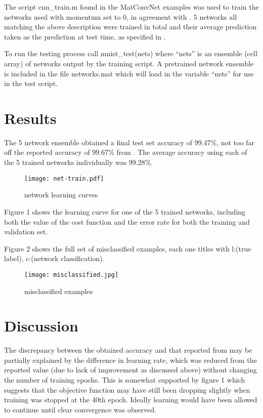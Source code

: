 \documentclass[a4paper,12pt]{article}
\begin{document}
The script cnn\_train.m found in the MatConvNet examples was used to train the networks used with momentum set to 0, in agreement with \cite{SRC}. 5 networks all matching the above description were trained in total and their average prediction taken as the prediction at test time, as specified in \cite{SRC}.

To run the testing process call mnist\_test(nets) where ``nets'' is an ensemble (cell array) of networks output by the training script. A pretrained network ensemble is included in the file networks.mat which will load in the variable ``nets''  for use in the test script.

\section{Results}
The 5 network ensemble obtained a final test set accuracy of 99.47\%, not too far off the reported accuracy of 99.67\% from \cite{SRC}. 
The average accuracy using each of the 5 trained networks individually was 99.28\%.
\begin{figure}[!ht]
  \caption{network learning curves}
  \centering
    \texttt{[image: net-train.pdf]}
\end{figure}

Figure 1 shows the learning curve for one of the 5 trained networks, including both the value of the cost function and the error rate for both the training and validation set.

Figure 2 shows the full set of misclassified examples, each one titles with l:(true label), c:(network classification).

\begin{figure}[!ht]
  \caption{misclassified examples}
  \centering
    \texttt{[image: misclassified.jpg]}
\end{figure}

\section{Discussion}
The discrepancy between the obtained accuracy and that reported from \cite{SRC} may be partially explained by the difference in learning rate, which was reduced from the reported value (due to lack of improvement as discussed above) without changing the number of training epochs. This is somewhat supported by figure 1 which suggests that the objective function may have still been dropping slightly when training was stopped at the 40th epoch. Ideally learning would have been allowed to continue until clear convergence was observed. 
\end{document}
